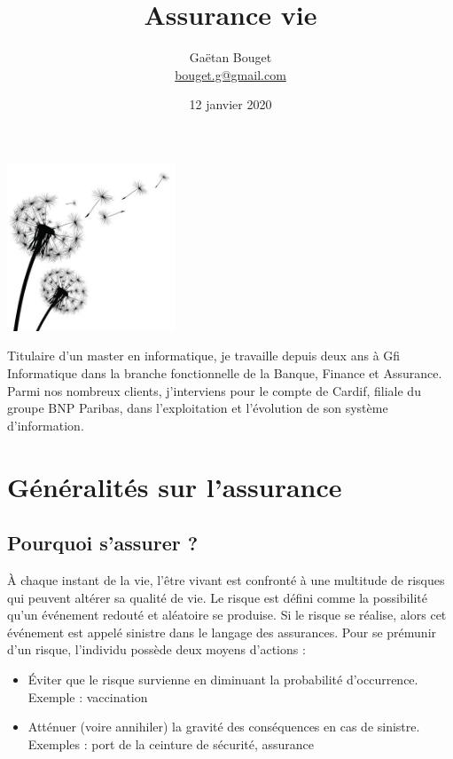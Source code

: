 \documentclass{article}
\title{Assurance vie}
\author{Gaëtan Bouget \\ \href{mailto:bouget.g@gmail.com}{bouget.g@gmail.com}}
\date{12 janvier 2020}
\begin{document}
\maketitle
\thispagestyle{empty}

\vspace{3cm}

\begin{center}
    \includegraphics[width=5cm]{dandelion.jpg}
\end{center}

\vspace{3cm}

Titulaire d'un master en informatique, je travaille depuis deux ans à Gfi Informatique dans la branche fonctionnelle de la Banque, Finance et Assurance. Parmi nos nombreux clients, j'interviens pour le compte de Cardif, filiale du groupe BNP Paribas, dans l'exploitation et l'évolution de son système d'information.

\newpage

\tableofcontents

\newpage

\section{Généralités sur l'assurance}

\subsection{Pourquoi s'assurer ?}
À chaque instant de la vie, l'être vivant est confronté à une multitude de risques qui peuvent altérer sa qualité de vie. Le risque est défini comme la possibilité qu'un événement redouté et aléatoire se produise. Si le risque se réalise, alors cet événement est appelé sinistre dans le langage des assurances. Pour se prémunir d'un risque, l'individu possède deux moyens d'actions :
\begin{itemize}
    \item Éviter que le risque survienne en diminuant la probabilité d'occurrence. \\ Exemple : vaccination
    \item Atténuer (voire annihiler) la gravité des conséquences en cas de sinistre. \\
    Exemples : port de la ceinture de sécurité, assurance
\end{itemize}
\end{document}
